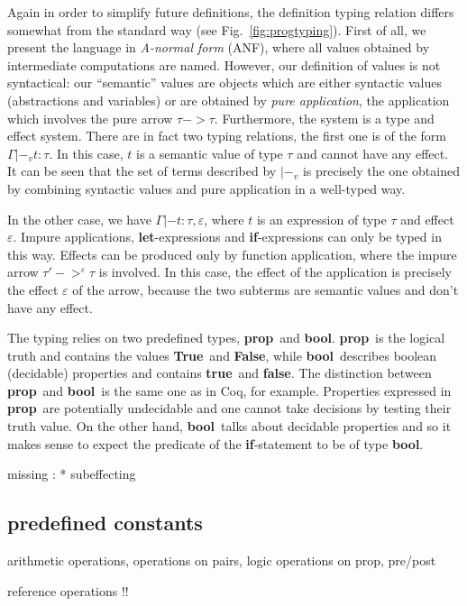 \documentclass[a4paper]{llncs}
\newcommand{\letml}{{\bf let}}
\newcommand{\ifml}{{\bf if}}
\newcommand{\propml}{{\bf prop}}
\newcommand{\boolml}{{\bf bool}}
\newcommand{\Trueml}{{\bf True}}
\newcommand{\Falseml}{{\bf False}}
\newcommand{\trueml}{{\bf true}}
\newcommand{\falseml}{{\bf false}}
\newcommand{\coq}{Coq}
\begin{document}
Again in order to simplify future definitions, the definition typing relation
differs somewhat from the standard way (see Fig.~\ref{fig:progtyping}). First of
all, we present the language in {\em A-normal form} (ANF), where all values
obtained by intermediate computations are named. However, our definition of
values is not syntactical: our ``semantic'' values are objects which are
either syntactic values (abstractions and variables) or are obtained by {\em
pure application}, the application which involves the pure arrow $τ->τ$.
Furthermore, the system is a type and effect system. There are in fact two
typing relations, the first one is of the form $Γ|-_v  t : τ$. In this case,
$t$ is a semantic value of type $τ$ and cannot have any effect. It can be seen
that the set of terms described by $|-_v$ is precisely the one obtained by
combining syntactic values and pure application in a well-typed way.

In the other case, we have $Γ|- t : τ, ε$, where $t$ is an expression of
type $τ$ and effect $ε$. Impure applications, \letml-expressions and
\ifml-expressions can only be typed in this way. Effects can be produced only
by function application, where the impure arrow $τ'->^ετ$ is involved. In this
case, the effect of the application is precisely the effect $ε$ of the arrow,
because the two subterms are semantic values and don't have any effect.

The typing relies on two predefined types, \propml\ and \boolml. \propml\ is
the logical truth and contains the values \Trueml\ and \Falseml, while
\boolml\ describes boolean (decidable) properties and contains \trueml\ and
\falseml. The distinction between \propml\ and \boolml\ is the same one as in
\coq, for example. Properties expressed in \propml\ are potentially
undecidable and one cannot take decisions by testing their truth value. On the
other hand, \boolml\ talks about decidable properties and so it makes sense to
expect the predicate of the \ifml-statement to be of type \boolml.

missing : 
* subeffecting


\subsection{predefined constants}

arithmetic operations, operations on pairs, logic operations on prop, pre/post

reference operations
!!
\end{document}
